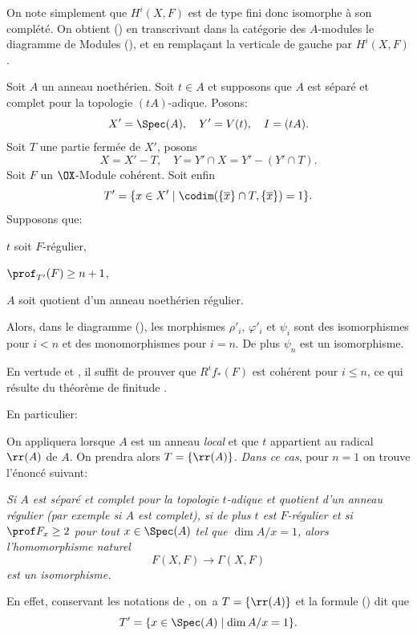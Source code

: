 On note simplement que $H^i(X, F)$ est de type fini donc isomorphe
\`a son compl\'et\'e. On obtient () en transcrivant dans
la cat\'egorie des $A$-modules le diagramme de Modules
(), et en rempla\c cant la verticale de gauche par
$H^i(X, F)$.

\begin{proposition}\setcounter {equation}{30} \label{IX.1.4}
Soit $A$ un anneau noeth\'erien. Soit $t\in A$ et supposons que $A$ est s\'epar\'e et complet pour la topologie $(tA)$-adique. Posons:
\begin{equation} \label{eq:IX.1.31}
X'=\Spec (A), \quad Y'=V(t), \quad I=(tA).
\end{equation}
Soit $T$ une partie ferm\'ee de $X'$, posons
\begin{equation} \label{eq:IX.1.32}
X=X'-T, \quad Y=Y'\cap X=Y'-(Y'\cap T).
\end{equation}
Soit $F$ un $\OX$-Module coh\'erent. Soit enfin
\begin{equation} \label{eq:IX.1.33}
T'= \{ x\in X' \mid \codim(\{ \overline{x}\} \cap T, \{\overline{x}\})=1\}.
\end{equation}
Supposons que:
\begin{enumeratea}
\item
$t$ soit $F$-r\'egulier,
\item
$\prof_{T'}(F) \geq n+1$,
\item
$A$ soit quotient d'un anneau noeth\'erien r\'egulier.
\end{enumeratea}
\noindent
Alors, dans le diagramme (), les morphismes $\rho'_i$, $\varphi'_i$ et $\psi_i$ sont des isomorphismes pour $i<n$ et des monomorphismes pour $i=n$. De plus $\psi_n$ est un isomorphisme.
\end{proposition}

En vertu\pageoriginale de  et , il suffit de prouver que $R^if_*(F)$ est coh\'erent pour $i\leq n$, ce qui r\'esulte du th\'eor\`eme de finitude .

En particulier:

\begin{exemple} \label{IX.1.5} On appliquera  lorsque $A$ est un anneau \emph{local} et que $t$ appartient au radical $\rr(A)$ de $A$. On prendra alors $T=\{ \rr(A)\}$. \emph{Dans ce cas}, pour $n=1$ on trouve l'\'enonc\'e suivant:

\emph{Si $A$ \ignorespaces est s\'epar\'e et complet pour la topologie $t$-adique et quotient d'un anneau r\'egulier (par exemple si $A$ est complet), si de plus $t$ est $F$-r\'egulier et si $\prof F_x\geq 2$ pour tout $x\in \Spec (A)$ tel que $\dim A/x=1$, alors l'homomorphisme naturel $$
F(X, F)\to \Gamma(X, F)$$ est un isomorphisme.}

En effet, conservant les notations de , on~a $T=\{ \rr(A)\}$ et la formule () dit que
$$
T'=\{x\in\Spec(A)\mid\dim A/x=1\}.
$$
\end{exemple}

